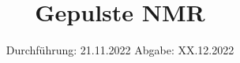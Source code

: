 

\subject{Versuch Nr.V49}
\title{Gepulste NMR}
\date{%
  Durchführung: 21.11.2022
  \hspace{3em}
  Abgabe: XX.12.2022
}



\maketitle
\thispagestyle{empty}
\tableofcontents
\newpage 






%

\nocite{*}

\printbibliography{}


